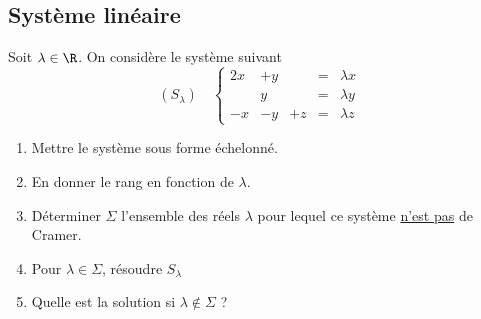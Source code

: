 \subsection{Système linéaire}


\begin{exercice}
Soit $\lambda \in \R$. On considère le système suivant 
$$(S_\lambda)\quad  \left\{ \begin{array}{ccccc}
2x &+y& & =& \lambda x\\
 &y & & =& \lambda y \\
 -x&-y&+z&=&\lambda z
\end{array}\right. $$

\begin{enumerate}
\item Mettre le système sous forme échelonné. 
\item En donner le rang en fonction de $\lambda$. 
\item Déterminer $\Sigma$ l'ensemble des réels $\lambda$ pour lequel ce système \underline{n'est pas} de Cramer. 
\item Pour $\lambda \in \Sigma$, résoudre $S_\lambda$
\item Quelle est la solution si $\lambda \notin \Sigma$ ? 
\end{enumerate}
\end{exercice}
